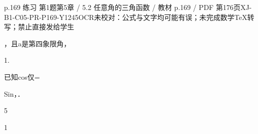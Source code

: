 \begin{bankitem}{p.169 练习 第1题}{第5章 / 5.2 任意角的三角函数 / 教材 p.169 / PDF 第176页}{XJ-B1-C05-PR-P169-Y1245}{OCR未校对：公式与文字均可能有误；未完成数学TeX转写；禁止直接发给学生}
\begin{ocrdraft}
\par
，且a是第四象限角，
\par
1.
\par
已知cos仅=
\par
Sin，．
\par
5
\par
1
\end{ocrdraft}
\end{bankitem}
